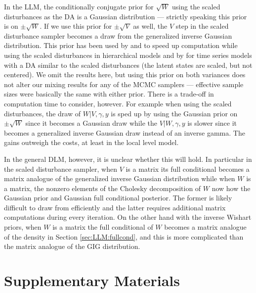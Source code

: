 \documentclass[12pt]{article}
\begin{document}
In the LLM, the conditionally conjugate prior for $\sqrt{W}$ using the scaled disturbances as the DA is a Gaussian distribution --- strictly speaking this prior is on $\pm \sqrt{W}$. If we use this prior for $\pm\sqrt{V}$ as well, the $V$ step in the scaled disturbance sampler becomes a draw from the generalized inverse Gaussian distribution. This prior has been used by \citet{fruhwirth2011bayesian} and \citet{fruhwirth2008bayesian} to speed up computation while using the scaled disturbances in hierarchical models and by \citet{fruhwirth2010stochastic} for time series models with a DA similar to the scaled disturbances (the latent states are scaled, but not centered). We omit the results here, but using this prior on both variances does not alter our mixing results for any of the MCMC samplers --- effective sample sizes were basically the same with either prior. There is a trade-off in computation time to consider, however. For example when using the scaled disturbances, the draw of $W|V,\gamma,y$ is sped up by using the Gaussian prior on $\pm\sqrt{W}$ since it becomes a Gaussian draw while the $V|W,\gamma,y$ is slower since it becomes a generalized inverse Gaussian draw instead of an inverse gamma. The gains outweigh the costs, at least in the local level model.

In the general DLM, however, it is unclear whether this will hold. In particular in the scaled disturbance sampler, when $V$ is a matrix its full conditional becomes a matrix analogue of the generalized inverse Gaussian distribution while when $W$ is a matrix, the nonzero elements of the Cholesky decomposition of $W$ now how the Gaussian prior and Gaussian full conditional posterior. The former is likely difficult to draw from efficiently and the latter requires additional matrix computations during every iteration. On the other hand with the inverse Wishart priors, when $W$ is a matrix the full conditional of $W$ becomes a matrix analogue of the density in Section \ref{sec:LLM:fullcond}, and this is more complicated than the matrix analogue of the GIG distribution.


\section{Supplementary Materials}
\end{document}
